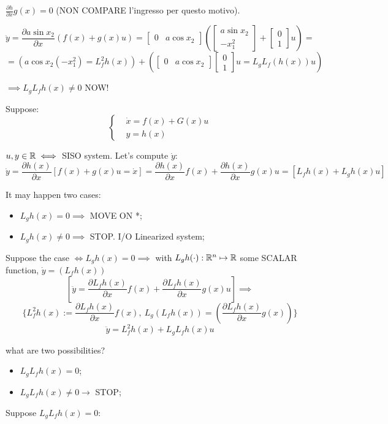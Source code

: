 $\frac{\partial{h}}{\partial{x}} g(x) = 0$ (NON COMPARE l'ingresso per questo motivo).

\[
	\ddot{y} = \frac{\partial{a\sin{x_2}}}{\partial{x}}(f(x)+g(x)u) = \begin{bmatrix}0&a\cos{x_2}\end{bmatrix}(\begin{bmatrix}a\sin{x_2}\\ -x_1^2\end{bmatrix} + \begin{bmatrix}0\\1\end{bmatrix}u) =
\]
\[
	= (a\cos{x_2}(-x_1^2) = L_f^2h(x)) + (\begin{bmatrix}0&a\cos{x_2}\end{bmatrix}\begin{bmatrix}0\\1\end{bmatrix}u = L_gL_f(h(x))u)
\]

$\implies L_gL_fh(x) \neq 0$ NOW!

Suppose:
\[
	\left\{
	\begin{aligned}
	&\dot{x} = f(x) + G(x)u \\
	&y=h(x)
	\end{aligned}
	\right.
\]

$u,y \in \mathbb{R} \iff$ SISO system. Let's compute $\dot{y}:$
\[
	\dot{y} = \frac{\partial{h(x)}}{\partial{x}}[f(x)+g(x)u = \dot{x}] = \frac{\partial{h(x)}}{\partial{x}}f(x) + \frac{\partial{h(x)}}{\partial{x}}g(x)u = [L_fh(x) + L_gh(x)u]
\]

It may happen two cases:
\begin{itemize}
\item $L_gh(x) = 0 \implies$ MOVE ON *;
\item $L_gh(x) \neq 0 \implies$ STOP. I/O Linearized system;
\end{itemize}

Suppose the case $\iff L_gh(x) = 0 \implies$ with $L_gh(\mathord{\cdot}):\mathbb{R}^n \mapsto \mathbb{R}$ some SCALAR function, $\dot{y}=(L_fh(x))$
\[
	[\ddot{y}=\frac{\partial{L_fh(x)}}{\partial{x}}f(x) + \frac{\partial{L_fh(x)}}{\partial{x}}g(x)u] \implies
\]
\[
	\{L^2_fh(x) := \frac{\partial{L_fh(x)}}{\partial{x}}f(x),\ L_g(L_fh(x)) = (\frac{\partial{L_fh(x)}}{\partial{x}}g(x))\}
\]
\[
	\ddot{y} = L^2_fh(x) + L_gL_fh(x)u
\]

what are two possibilities?
\begin{itemize}
\item $L_gL_fh(x)=0$;
\item $L_gL_fh(x)\neq 0 \rightarrow$ STOP;
\end{itemize}
Suppose $L_gL_fh(x) = 0$:

